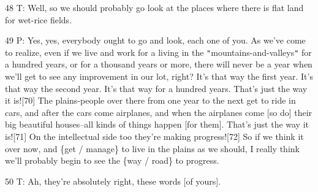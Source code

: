 48 T: Well, so we should probably go look at the places where there is flat land
for wet-rice fields.

49 P: Yes, yes, everybody ought to go and look, each one of you. As we've come
to realize, even if we live and work for a living in the \texttt{"}mountains-and-valleys\texttt{"}
for a hundred years, or for a thousand years or more, there will never be a year
when we'll get to see any improvement in our lot, right? It's that way the first
year. It's that way the second year. It's that way for a hundred years. That's
just the way it is![70]  The plains-people over there from one year to the next
get to ride in cars, and after the cars come airplanes, and when the airplanes
come [so do] their big beautiful houses--all kinds of things happen [for them].
That's just the way it is![71] On the intellectual side too they're making progress![72]
So if we think it over now, and \{get / manage\} to live in the plains as we should,
I really think we'll probably begin to see the \{way / road\} to progress.

50 T: Ah, they're absolutely right, these words [of yours].


